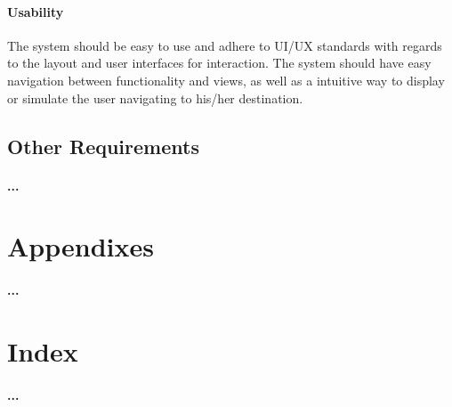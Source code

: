 \documentclass[runningheads,a4paper]{llncs}
\begin{document}
\paragraph{Usability \\}
The system should be easy to use and adhere to UI/UX standards with regards to the layout and user interfaces for interaction. The system should have easy navigation between functionality and views, as well as a intuitive way to display or simulate the user navigating to his/her destination.



\subsection{Other Requirements}
\paragraph{...}

\section{Appendixes}
\paragraph{...}

\section{Index}
\paragraph{...}
\end{document}
